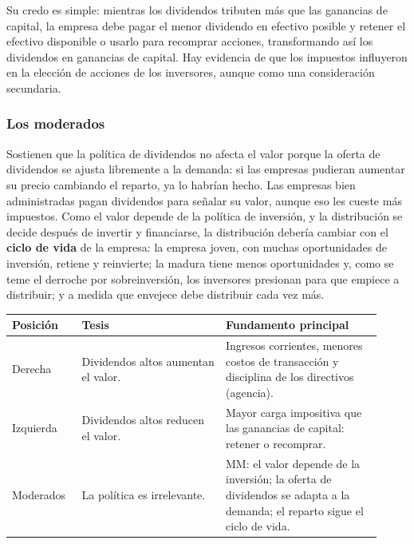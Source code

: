 Su credo es simple: mientras los dividendos tributen más que las ganancias de capital, la empresa debe pagar el menor dividendo en efectivo posible y retener el efectivo disponible o usarlo para recomprar acciones, transformando así los dividendos en ganancias de capital. Hay evidencia de que los impuestos influyeron en la elección de acciones de los inversores, aunque como una consideración secundaria.

\subsubsection{Los moderados}

Sostienen que la política de dividendos no afecta el valor porque la oferta de dividendos se ajusta libremente a la demanda: si las empresas pudieran aumentar su precio cambiando el reparto, ya lo habrían hecho. Las empresas bien administradas pagan dividendos para señalar su valor, aunque eso les cueste más impuestos. Como el valor depende de la política de inversión, y la distribución se decide después de invertir y financiarse, la distribución debería cambiar con el \textbf{ciclo de vida} de la empresa: la empresa joven, con muchas oportunidades de inversión, retiene y reinvierte; la madura tiene menos oportunidades y, como se teme el derroche por sobreinversión, los inversores presionan para que empiece a distribuir; y a medida que envejece debe distribuir cada vez más.

\begin{center}
\small
\begin{tabular}{@{}p{0.17\linewidth}p{0.36\linewidth}p{0.39\linewidth}@{}}
\toprule
Posición & Tesis & Fundamento principal\\
\midrule
Derecha & Dividendos altos aumentan el valor. & Ingresos corrientes, menores costos de transacción y disciplina de los directivos (agencia).\\
\addlinespace
Izquierda & Dividendos altos reducen el valor. & Mayor carga impositiva que las ganancias de capital: retener o recomprar.\\
\addlinespace
Moderados & La política es irrelevante. & MM: el valor depende de la inversión; la oferta de dividendos se adapta a la demanda; el reparto sigue el ciclo de vida.\\
\bottomrule
\end{tabular}
\end{center}

